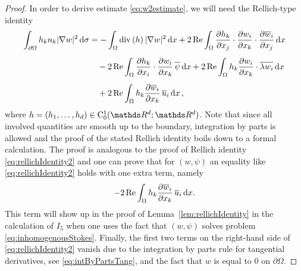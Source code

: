 \begin{proof}
  In order to derive estimate \eqref{eq:w2estimate}, we will need the Rellich-type identity
  \begin{align}
    \int_{\partial\Omega} h_k n_k |\nabla w|^2 \, {\operatorname{d}\!{\sigma}}
    &= - \int_\Omega \mathrm{div\,} (h)\, |\nabla w|^2 \, {\operatorname{d}\!{x}} 
    + 2 \operatorname{Re} \int_\Omega \frac{\partial h_k}{\partial x_j} \cdot \frac{\partial w_i}{\partial x_k} \cdot \frac{\partial \overline w_i}{\partial x_j} \, {\operatorname{d}\!{x}}  \nonumber\\[0.5em]
    &\quad - 2 \operatorname{Re} \int_\Omega \frac{\partial h_k}{\partial x_i} \cdot \frac{\partial w_i}{\partial x_k} \, \overline \psi \, {\operatorname{d}\!{x}} 
    + 2 \operatorname{Re} \int_\Omega h_k \frac{\partial w_i}{\partial x_k} \cdot \overline{ \lambda w_i} \, {\operatorname{d}\!{x}}  \nonumber\\[0.5em]
    &\quad + 2 \operatorname{Re} \int_{\Omega} h_k \frac{\partial \overline w_i}{\partial x_k} \, \overline u_i \, {\operatorname{d}\!{x}}\,, \label{eq:rellichIdentity3}
  \end{align}
  where $h = (h_1, \dots,h_d) \in \CC_0^1(\R^d; \R^d)$.
  Note that since all involved quantities are smooth up to the boundary, integration by parts is allowed and the proof of the stated  Rellich identity boils down to a formal calculation.
  The proof is analogous to the proof of Rellich identity \eqref{eq:rellichIdentity2} and one can prove that for $(w,\psi)$ an equality like \eqref{eq:rellichIdentity2} holds with one extra term, namely
  \begin{align*}
      - 2\operatorname{Re} \int_\Omega h_k \frac{\partial \overline w_i}{\partial x_k} \, \overline u_i \, {\operatorname{d}\!{x}}.
  \end{align*}
  This term will show up in the proof of Lemma~\ref{lem:rellichIdentity} in the calculation of $I_5$ when one uses the fact that $(w,\psi)$ solves problem \eqref{eq:inhomogenousStokes}.
  Finally, the first two terms on the right-hand side of \eqref{eq:rellichIdentity2} vanish due to the integration by parts rule for tangential derivatives, see \eqref{eq:intByPartsTang}, and the fact that $w$ is equal to $0$ on  $\partial\Omega$.


\end{proof}
